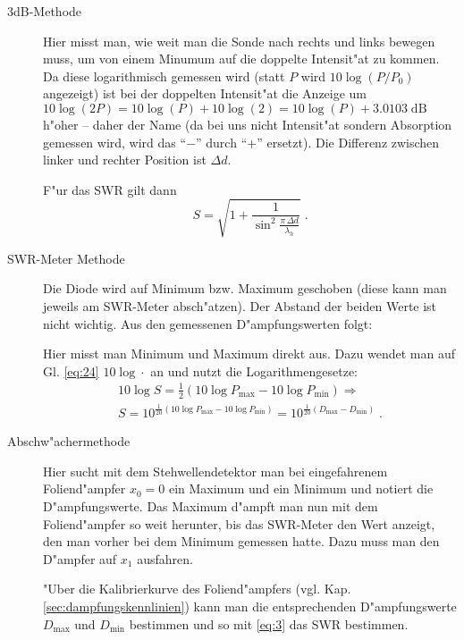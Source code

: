 \documentclass[a4paper,12pt]{article}
\newcommand{\folgt}{\ensuremath{\Rightarrow}}
\begin{document}
\begin{description}
\item[3dB-Methode]  Hier misst man, wie weit man die Sonde nach rechts und links bewegen
 muss, um von einem Minumum auf die doppelte Intensit"at zu kommen.
 Da diese logarithmisch gemessen wird (statt $P$ wird $10 \log(P/P_0)$
 angezeigt) ist bei der doppelten Intensit"at die Anzeige um
 $10\log(2P) = 10\log(P) + 10\log(2) = 10\log(P) +
 3.0103\operatorname{dB}$ h"oher -- daher der Name (da bei uns nicht
 Intensit"at sondern Absorption gemessen wird, wird das "`$-$"' durch
 "`$+$"' ersetzt). Die Differenz zwischen linker und rechter Position
 ist $\Delta d$.

 F"ur das SWR gilt dann \cite[S. 15]{beilage_ausfuehrlich}
 \begin{equation}
   \label{eq:27}
   S = \sqrt{ 1 + \frac 1 {\sin^2 \frac{ \pi \, \Delta d } { \lambda_h
      } } } \;.
 \end{equation}
\item[SWR-Meter Methode] Die Diode wird auf Minimum bzw. Maximum
  geschoben (diese kann man jeweils am SWR-Meter absch"atzen). Der
  Abstand der beiden Werte ist nicht wichtig. Aus den gemessenen
  D"ampfungswerten folgt:

Hier misst man Minimum und Maximum direkt aus. Dazu wendet man auf
Gl. \eqref{eq:24}
 $10\log\cdot$ an und nutzt die Logarithmengesetze:
\begin{eqnarray}
\nonumber
  10 \log S = \frac 1 2 (10 \log P_\text{max} - 10 \log P_\text{min} )
  \folgt \\
\label{eq:3}
S = 10^{ \frac 1 {20} (10 \log P_\text{max} - 10 \log P_\text{min} ) }
= 10^{ \frac 1 {20} (D_\text{max} - D_\text{min} ) } \;.
\end{eqnarray}
\item[Abschw"achermethode] Hier sucht mit dem Stehwellendetektor man
  bei eingefahrenem Foliend"ampfer $x_0 = 0$ ein Maximum und ein
  Minimum und notiert die D"ampfungswerte. Das Maximum d"ampft man nun
  mit dem Foliend"ampfer so weit herunter, bis das SWR-Meter den Wert
  anzeigt, den man vorher bei dem Minimum gemessen hatte. Dazu muss
  man den D"ampfer auf $x_1$ ausfahren. 

  "Uber die Kalibrierkurve des Foliend"ampfers
  (vgl. Kap. \ref{sec:dampfungskennlinien}) kann man die
  entsprechenden D"ampfungswerte $D_\text{max}$ und $D_\text{min}$
  bestimmen und so mit \eqref{eq:3} das SWR bestimmen.
\end{description}
\end{document}
